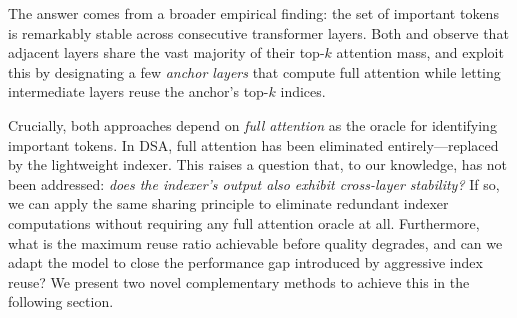 The answer comes from a broader empirical finding: the set of important tokens is remarkably stable across consecutive transformer layers.
Both \citet{kascade} and \citet{hysparse} observe that adjacent layers share the vast majority of their top-$k$ attention mass, and exploit this by designating a few \emph{anchor layers} that compute full attention while letting intermediate layers reuse the anchor's top-$k$ indices.

Crucially, both approaches depend on \emph{full attention} as the oracle for identifying important tokens.
In DSA, full attention has been eliminated entirely---replaced by the lightweight indexer.
This raises a question that, to our knowledge, has not been addressed: \emph{does the indexer's output also exhibit cross-layer stability?}
If so, we can apply the same sharing principle to eliminate redundant indexer computations without requiring any full attention oracle at all.
Furthermore, what is the maximum reuse ratio achievable before quality degrades, and can we adapt the model to close the performance gap introduced by aggressive index reuse? We present two novel complementary methods to achieve this in the following section.